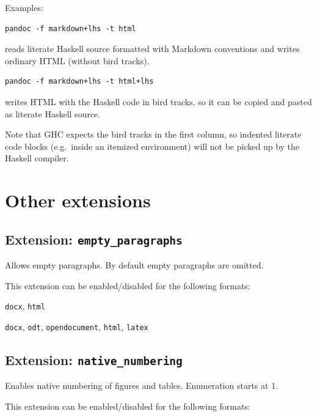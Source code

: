 \documentclass[
  b5paper
]{book}
\providecommand{\tightlist}{%
  \setlength{\itemsep}{0pt}\setlength{\parskip}{0pt}}
\begin{document}
Examples:

\begin{verbatim}
pandoc -f markdown+lhs -t html
\end{verbatim}

reads literate Haskell source formatted with Markdown conventions and
writes ordinary HTML (without bird tracks).

\begin{verbatim}
pandoc -f markdown+lhs -t html+lhs
\end{verbatim}

writes HTML with the Haskell code in bird tracks, so it can be copied
and pasted as literate Haskell source.

Note that GHC expects the bird tracks in the first column, so indented
literate code blocks (e.g.~inside an itemized environment) will not be
picked up by the Haskell compiler.

\section{Other extensions}\label{other-extensions}

\subsection{\texorpdfstring{Extension:
\texttt{empty\_paragraphs}}{Extension: empty\_paragraphs}}\label{extension-empty_paragraphs}

Allows empty paragraphs. By default empty paragraphs are omitted.

This extension can be enabled/disabled for the following formats:

\begin{description}
\tightlist
\item[input formats]
\texttt{docx}, \texttt{html}
\item[output formats]
\texttt{docx}, \texttt{odt}, \texttt{opendocument}, \texttt{html},
\texttt{latex}
\end{description}

\subsection{\texorpdfstring{Extension:
\texttt{native\_numbering}}{Extension: native\_numbering}}\label{extension-native_numbering}

Enables native numbering of figures and tables. Enumeration starts at 1.

This extension can be enabled/disabled for the following formats:
\end{document}
